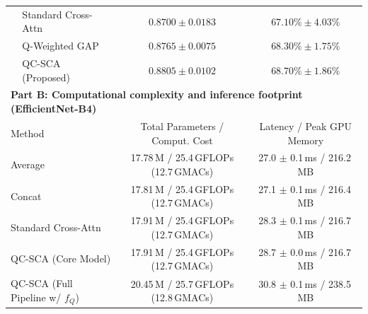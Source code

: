 \documentclass[final,5p,times,twocolumn,authoryear]{elsarticle}
\newcommand{\qcsca}{QC-SCA}
\theoremstyle{plain}
\theoremstyle{remark}
\begin{document}
\begin{table}[!tb]
\begin{tabular}{llcc}
  & Standard Cross-Attn   & $0.8700 \pm 0.0183$ & $67.10\% \pm 4.03\%$ \\
  & Q-Weighted GAP        & $0.8765 \pm 0.0075$ & $68.30\% \pm 1.75\%$ \\
  & \qcsca{} (Proposed)   & $\mathbf{0.8805 \pm 0.0102}$ & $\mathbf{68.70\% \pm 1.86\%}$ \\
\midrule
\multicolumn{4}{l}{\textbf{Part B: Computational complexity and inference footprint (EfficientNet-B4)}} \\
\multicolumn{2}{l}{Method} & Total Parameters / Comput. Cost & Latency / Peak GPU Memory \\
\midrule
\multicolumn{2}{l}{Average}                               & 17.78\,M / 25.4\,GFLOPs (12.7\,GMACs) & 27.0 $\pm$ 0.1\,ms / 216.2\,MB \\
\multicolumn{2}{l}{Concat}                                & 17.81\,M / 25.4\,GFLOPs (12.7\,GMACs) & 27.1 $\pm$ 0.1\,ms / 216.4\,MB \\
\multicolumn{2}{l}{Standard Cross-Attn}                   & 17.91\,M / 25.4\,GFLOPs (12.7\,GMACs) & 28.3 $\pm$ 0.1\,ms / 216.7\,MB \\
\multicolumn{2}{l}{\qcsca{} (Core Model)}                 & 17.91\,M / 25.4\,GFLOPs (12.7\,GMACs) & 28.7 $\pm$ 0.0\,ms / 216.7\,MB \\
\multicolumn{2}{l}{\qcsca{} (Full Pipeline w/ $f_Q$)}     & 20.45\,M / 25.7\,GFLOPs (12.8\,GMACs) & 30.8 $\pm$ 0.1\,ms / 238.5\,MB \\
\bottomrule
\end{tabular}
\end{table}
\end{document}
